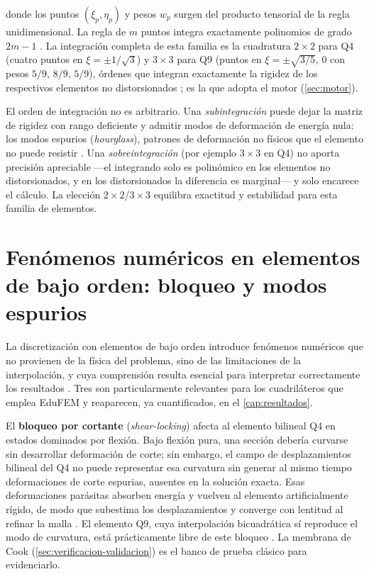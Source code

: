 donde los puntos $(\xi_p,\eta_p)$ y pesos $w_p$ surgen del producto tensorial de la regla unidimensional. La regla de $m$ puntos integra exactamente polinomios de grado $2m-1$ \autocites[pp.~141-142]{hughes2000fem}[p.~161]{zienkiewicz2013fem}. La integración completa de esta familia es la cuadratura $2\times2$ para Q4 (cuatro puntos en $\xi = \pm 1/\sqrt{3}$) y $3\times3$ para Q9 (puntos en $\xi = \pm\sqrt{3/5},\,0$ con pesos $5/9,\,8/9,\,5/9$), órdenes que integran exactamente la rigidez de los respectivos elementos no distorsionados \autocites[pp.~221-222]{hughes2000fem}[p.~470]{bathe2014fem}; es la que adopta el motor (\autoref{sec:motor}).

El orden de integración no es arbitrario. Una \emph{subintegración} puede dejar la matriz de rigidez con rango deficiente y admitir modos de deformación de energía nula: los modos espurios (\emph{hourglass}), patrones de deformación no físicos que el elemento no puede resistir \autocites[p.~223]{cook2002concepts}[pp.~469-472]{bathe2014fem}. Una \emph{sobreintegración} (por ejemplo $3\times3$ en Q4) no aporta precisión apreciable —el integrando solo es polinómico en los elementos no distorsionados, y en los distorsionados la diferencia es marginal— y solo encarece el cálculo. La elección $2\times2$/$3\times3$ equilibra exactitud y estabilidad para esta familia de elementos.

\section{Fenómenos numéricos en elementos de bajo orden: bloqueo y modos espurios}
\label{sec:locking}

La discretización con elementos de bajo orden introduce fenómenos numéricos que no provienen de la física del problema, sino de las limitaciones de la interpolación, y cuya comprensión resulta esencial para interpretar correctamente los resultados \autocite{cook2002concepts,hughes2000fem,bathe2014fem}. Tres son particularmente relevantes para los cuadriláteros que emplea EduFEM y reaparecen, ya cuantificados, en el \autoref{cap:resultados}.

El \textbf{bloqueo por cortante} (\emph{shear-locking}) afecta al elemento bilineal Q4 en estados dominados por flexión. Bajo flexión pura, una sección debería curvarse sin desarrollar deformación de corte; sin embargo, el campo de desplazamientos bilineal del Q4 no puede representar esa curvatura sin generar al mismo tiempo deformaciones de corte espurias, ausentes en la solución exacta. Esas deformaciones parásitas absorben energía y vuelven al elemento artificialmente rígido, de modo que subestima los desplazamientos y converge con lentitud al refinar la malla \autocites[pp.~98-99]{cook2002concepts}[p.~243]{hughes2000fem}. El elemento Q9, cuya interpolación bicuadrática sí reproduce el modo de curvatura, está prácticamente libre de este bloqueo \autocites[pp.~235-236]{cook2002concepts}[p.~243]{hughes2000fem}. La membrana de Cook (\autoref{sec:verificacion-validacion}) es el banco de prueba clásico para evidenciarlo.

